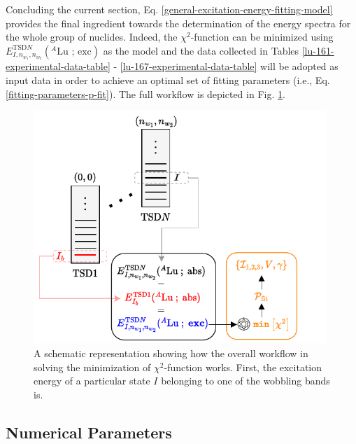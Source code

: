Concluding the current section, Eq. \ref{general-excitation-energy-fitting-model} provides the final ingredient towards the determination of the energy spectra for the whole group of nuclides. Indeed, the $\chi^2$-function can be minimized using $E_{I,n_{w_1},n_{w_2}}^{\text{TSD}N}(^A\text{Lu\ ;\ exc})$ as the model and the data collected in Tables \ref{lu-161-experimental-data-table} - \ref{lu-167-experimental-data-table} will be adopted as input data in order to achieve an optimal set of fitting parameters (i.e., Eq. \ref{fitting-parameters-p-fit}). The full workflow is depicted in Fig. \ref{fitting-workflow-fig}.
\begin{figure}
    \centering
    \includegraphics[width=0.99\textwidth]{Chapters/Figures/fitting_procedure_chi2.pdf}
    \caption{A schematic representation showing how the overall workflow in solving the minimization of $\chi^2$-function works. First, the excitation energy of a particular state $I$ belonging to one of the wobbling bands is.}
    \label{fitting-workflow-fig}
\end{figure}

\subsection{Numerical Parameters}

